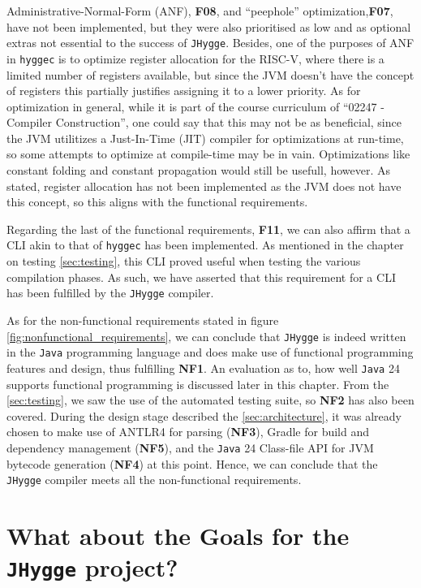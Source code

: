 Administrative-Normal-Form (ANF), \textbf{F08}, and ``peephole'' optimization,\textbf{F07}, have not been implemented, but they were also prioritised as low and as optional
extras not essential to the success of \texttt{JHygge}. Besides, one of the purposes of ANF in \texttt{hyggec} is to optimize register
allocation for the RISC-V, where there is a limited number of registers available, but since the JVM doesn't have the concept of registers
this partially justifies assigning it to a lower priority. As for optimization in general, while it is part of the course
curriculum of ``02247 - Compiler Construction'', one could say that this may not be as beneficial, since the JVM utilitizes a Just-In-Time (JIT)
compiler for optimizations at run-time, so some attempts to optimize at compile-time may be in vain. Optimizations like constant folding
and constant propagation would still be usefull, however. As stated, register allocation has not been implemented as the JVM does not have
this concept, so this aligns with the functional requirements.

Regarding the last of the functional requirements, \textbf{F11}, we can also affirm that a CLI akin to that of \texttt{hyggec} has been implemented. As
mentioned in the chapter on testing \ref{sec:testing}, this CLI proved useful when testing the various compilation phases.
As such, we have asserted that this requirement for a CLI has been fulfilled by the \texttt{JHygge} compiler.

As for the non-functional requirements stated in figure \ref{fig:nonfunctional_requirements}, we can conclude that \texttt{JHygge} is indeed written in the \texttt{Java} programming language and does make use of functional programming features and design,
thus fulfilling \textbf{NF1}.
An evaluation as to, how well \texttt{Java} 24 supports functional programming
is discussed later in this chapter. From the \ref{sec:testing}, we saw the use of the automated testing suite, so \textbf{NF2}
has also been covered. During the design stage described the \ref{sec:architecture}, it was already chosen to make use
of ANTLR4 for parsing (\textbf{NF3}), Gradle for build and dependency management (\textbf{NF5}), and
the \texttt{Java} 24 Class-file API for JVM bytecode generation (\textbf{NF4}) at this point.
Hence, we can conclude that the \texttt{JHygge} compiler meets all the non-functional requirements.

\section{What about the Goals for the \texttt{JHygge} project?}


